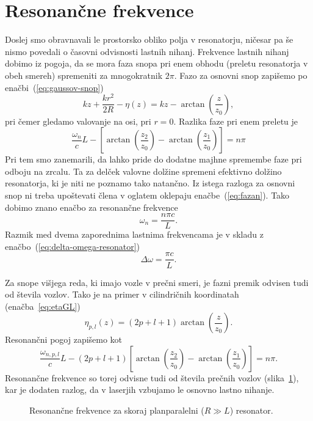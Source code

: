 \section{Resonančne frekvence}
Doslej smo obravnavali le prostorsko obliko polja v resonatorju, ničesar pa še nismo
povedali o časovni odvisnosti lastnih nihanj. Frekvence
lastnih nihanj dobimo iz pogoja, da se mora faza snopa pri enem obhodu
(preletu resonatorja v obeh smereh) spremeniti za mnogokratnik
$2\pi$. Fazo za osnovni snop zapišemo po enačbi~(\ref{eq:gaussov-snop})
\begin{equation}
kz+\frac{kr^{2}}{2R} -\eta(z) = kz-\arctan \left(\frac{z}{z_{0}}\right),
\label{eq:fazag}
\end{equation}
pri čemer  gledamo valovanje na osi, pri $r=0$. 
Razlika faze pri enem preletu je 
\begin{equation}
\frac{\omega_{n}}{c}L-\left[\arctan \left(\frac{z_{2}}{z_{0}}\right)-
\arctan\left(\frac{z_{1}}{z_{0}}\right)\right]=n\pi
\label{eq:fazan}
\end{equation}
Pri tem smo zanemarili, da lahko pride do dodatne majhne spremembe
faze pri odboju na zrcalu. Ta za delček valovne dolžine
spremeni efektivno dolžino resonatorja, ki je niti ne poznamo
tako natančno. Iz istega razloga za osnovni snop ni treba upoštevati člena
v oglatem oklepaju enačbe~(\ref{eq:fazan}). Tako dobimo znano enačbo za resonančne frekvence 
\begin{equation}
\omega_{n}=\frac{n\pi c}{L}.
\label{eq:omega}
\end{equation}
Razmik med dvema zaporednima lastnima frekvencama je v skladu z enačbo~(\ref{eq:delta-omega-resonator})
\begin{equation}
\Delta\omega=\frac{\pi c}{L}.
\label{eq:deltaomega}
\end{equation}

Za snope višjega reda, ki imajo vozle v prečni smeri, je fazni premik
odvisen tudi od števila vozlov. Tako je na primer v cilindričnih koordinatah
(enačba~\ref{eq:etaGL})
\begin{equation}
\eta_{p,l}(z)=(2p+l+1)\arctan\left(\frac{z}{z_{0}}\right).
\end{equation}
Resonančni pogoj zapišemo kot
\begin{equation}
\frac{\omega_{n,p,l}}{c}L-(2p+l+1)\left[\arctan\left(\frac{z_{2}}{z_{0}}\right)-
\arctan\left(\frac{z_{1}}{z_{0}}\right)\right]=n\pi.
\end{equation}
Resonančne frekvence so torej odvisne tudi od števila prečnih vozlov (slika~\ref{fig:crte}),
kar je dodaten razlog, da v laserjih vzbujamo le osnovno lastno nihanje.
\begin{figure}[h]
\centering
\def\svgwidth{90truemm} 

\caption{Resonančne frekvence za skoraj planparalelni ($R\gg L$) resonator.}
\label{fig:crte}
\end{figure}

